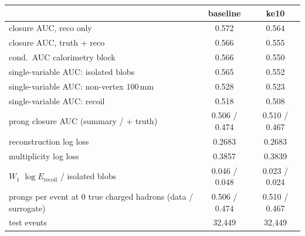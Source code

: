 \begin{tabular}{lcc}
\toprule
 & baseline & ke10 \\
\midrule
closure AUC, reco only & 0.572 & 0.564 \\
closure AUC, truth + reco & 0.566 & 0.555 \\
cond.\ AUC calorimetry block & 0.566 & 0.550 \\
single-variable AUC: isolated blobs & 0.565 & 0.552 \\
single-variable AUC: non-vertex 100\,mm & 0.528 & 0.523 \\
single-variable AUC: recoil & 0.518 & 0.508 \\
prong closure AUC (summary / + truth) & 0.506 / 0.474 & 0.510 / 0.467 \\
reconstruction log loss & 0.2683 & 0.2683 \\
multiplicity log loss & 0.3857 & 0.3839 \\
$W_1$ $\log E_\mathrm{recoil}$ / isolated blobs & 0.046 / 0.048 & 0.023 / 0.024 \\
prongs per event at 0 true charged hadrons (data / surrogate) & 0.506 / 0.474 & 0.510 / 0.467 \\
test events & 32,449 & 32,449 \\
\bottomrule
\end{tabular}
